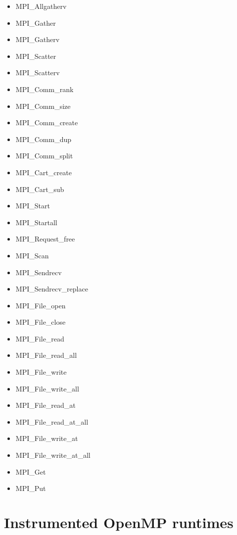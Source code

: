 \begin{itemize}
\item MPI\_Allgatherv
\item MPI\_Gather
\item MPI\_Gatherv
\item MPI\_Scatter
\item MPI\_Scatterv
\item MPI\_Comm\_rank
\item MPI\_Comm\_size
\item MPI\_Comm\_create
\item MPI\_Comm\_dup
\item MPI\_Comm\_split
\item MPI\_Cart\_create
\item MPI\_Cart\_sub
\item MPI\_Start
\item MPI\_Startall
\item MPI\_Request\_free
\item MPI\_Scan
\item MPI\_Sendrecv
\item MPI\_Sendrecv\_replace
\item MPI\_File\_open\footnotemark[2]
\item MPI\_File\_close\footnotemark[2]
\item MPI\_File\_read\footnotemark[2]
\item MPI\_File\_read\_all\footnotemark[2]
\item MPI\_File\_write\footnotemark[2]
\item MPI\_File\_write\_all\footnotemark[2]
\item MPI\_File\_read\_at\footnotemark[2]
\item MPI\_File\_read\_at\_all\footnotemark[2]
\item MPI\_File\_write\_at\footnotemark[2]
\item MPI\_File\_write\_at\_all\footnotemark[2]
\item MPI\_Get\footnotemark[3]
\item MPI\_Put\footnotemark[3]
\end{itemize}


\section{Instrumented OpenMP runtimes}\label{sec:OpenMPruntimesinstrumented}

